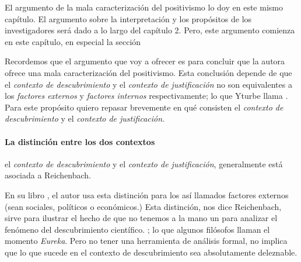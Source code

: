 El argumento de la mala caracterización del positivismo lo doy en este mismo capítulo.
El argumento sobre la interpretación y los propósitos de los investigadores será dado a lo largo del capítulo 2.
Pero, este argumento comienza en este capítulo, en especial la sección 

Recordemos que el argumento que voy a ofrecer es para concluir que la autora ofrece una mala caracterización del positivismo.
Esta conclusión depende de que el \emph{contexto de descubrimiento} y el \emph{contexto de justificación} no son equivalentes a los \emph{factores externos} y \emph{factores internos} respectivamente; lo que Yturbe llama .
Para este propósito quiero repasar brevemente en qué consisten el \emph{contexto de descubrimiento} y el \emph{contexto de justificación.}


\paragraph{La distinción entre los dos contextos} el \emph{contexto de descubrimiento} y el \emph{contexto de justificación}, generalmente está asociada a Reichenbach.

En su libro , el autor usa esta distinción para  los así llamados factores externos (sean sociales, políticos o económicos.) 
Esta distinción, nos dice Reichenbach, sirve para ilustrar el hecho de que no tenemos a la mano un  para analizar el fenómeno del descubrimiento científico.
; lo que algunos filósofos \parencite{reichenbach1938experience, Seo2015} llaman el momento \emph{Eureka}.
Pero no tener una herramienta de análisis formal, no implica que lo que sucede en el contexto de descubrimiento sea absolutamente deleznable.

